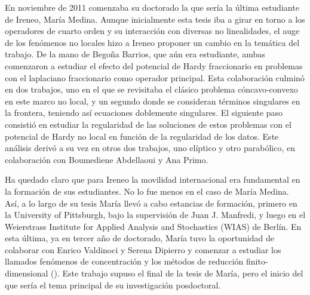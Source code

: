 En noviembre de 2011 comenzaba su doctorado la que ser\'ia la \'ultima estudiante de Ireneo, Mar\'ia Medina. Aunque inicialmente esta tesis iba a girar en torno a los operadores de cuarto orden y su interacci\'on con diversas no linealidades, el auge de los fen\'omenos no locales hizo a Ireneo proponer un cambio en la tem\'atica del trabajo. De la mano de Bego\~na Barrios, que a\'un era estudiante, ambas comenzaron a estudiar el efecto del potencial de Hardy fraccionario en problemas con el laplaciano fraccionario como operador principal. Esta colaboraci\'on culmin\'o en dos trabajos, uno  en el que se revisitaba el cl\'asico problema c\'oncavo-convexo en este marco no local, 
y un segundo donde se consideran t\'erminos singulares en la frontera, teniendo as\'i ecuaciones doblemente singulares. El siguiente paso consisti\'o en estudiar la regularidad de las soluciones de estos problemas con el potencial de Hardy no local en funci\'on de la regularidad de los datos. Este an\'alisis deriv\'o a su vez en otros dos trabajos, uno el\'iptico y otro parab\'olico, en colaboraci\'on con  Boumediene Abdellaoui y Ana Primo.

Ha quedado claro que para Ireneo la movilidad internacional era fundamental en la formaci\'on de sus estudiantes. No lo fue menos en el caso de Mar\'ia Medina. As\'i, a lo largo de su tesis Mar\'ia llev\'o a cabo  estancias de formaci\'on, primero en la University of Pittsburgh, bajo la supervisi\'on de Juan J. Manfredi, y luego en el Weierstrass Institute for Applied Analysis and Stochastics (WIAS) de Berl\'in. En esta \'ultima, ya en tercer a\~no de doctorado, Mar\'ia tuvo la oportunidad de colaborar con {Enrico Valdinoci y Serena Dipierro} y comenzar a estudiar los llamados fen\'omenos de concentraci\'on y los m\'etodos de reducci\'on finito-dimensional {(\cite{DMPV})}. Este trabajo supuso el final de la tesis de Mar\'ia, pero el inicio del que ser\'ia el tema principal de su investigaci\'on posdoctoral. 

